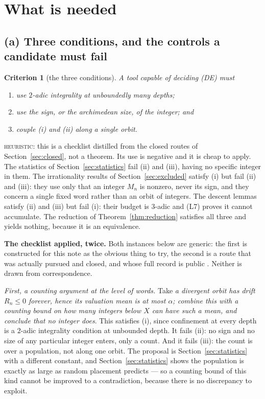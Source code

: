 \documentclass[11pt,reqno]{amsart}
\theoremstyle{plain}
\newtheorem{criterion}[theorem]{Criterion}
\theoremstyle{definition}
\newcommand{\lab}[1]{\textnormal{\textsc{\small #1}}}
\begin{document}
\section{What is needed}\label{sec:needed}

\subsection*{(a) Three conditions, and the controls a candidate must fail}

\begin{criterion}[the three conditions]\label{crit:three}
A tool capable of deciding \textup{(DE)} must
\begin{enumerate}
\item[(i)] use $2$-adic integrality at unboundedly many depths;
\item[(ii)] use the sign, or the archimedean size, of the integer; and
\item[(iii)] couple (i) and (ii) along a \emph{single} orbit.
\end{enumerate}
\end{criterion}
\lab{heuristic}: this is a checklist distilled from the closed routes of
Section~\ref{sec:closed}, not a theorem. Its use is negative and it is cheap to
apply. The statistics of Section~\ref{sec:statistics} fail (ii) and (iii), having
no specific integer in them. The irrationality results of
Section~\ref{sec:excluded} satisfy (i) but fail (ii) and (iii): they use only that
an integer $M_n$ is nonzero, never its sign, and they concern a single fixed word
rather than an orbit of integers. The descent lemmas satisfy (ii) and (iii) but
fail (i): their budget is $3$-adic and (L7) proves it cannot accumulate. The
reduction of Theorem~\ref{thm:reduction} satisfies all three and yields nothing,
because it is an equivalence.

\medskip
\noindent\textbf{The checklist applied, twice.} Both instances below are generic:
the first is constructed for this note as the obvious thing to try, the second is
a route that was actually pursued and closed, and whose full record is public
\cite{EOCDivergenceRepo}. Neither is drawn from correspondence.

\emph{First, a counting argument at the level of words.} Take
\emph{a divergent orbit has drift
$R_n\le0$ forever, hence its valuation mean is at most $\alpha$; combine this with
a counting bound on how many integers below $X$ can have such a mean, and conclude
that no integer does}. This satisfies (i), since confinement at every depth is a
$2$-adic integrality condition at unbounded depth. It fails (ii): no sign and no
size of any particular integer enters, only a count. And it fails (iii): the count
is over a population, not along one orbit. The proposal is
Section~\ref{sec:statistics} with a different constant, and
Section~\ref{sec:statistics} shows the population is exactly as large as random
placement predicts --- so a counting bound of this kind cannot be improved to a
contradiction, because there is no discrepancy to exploit.
\end{document}
